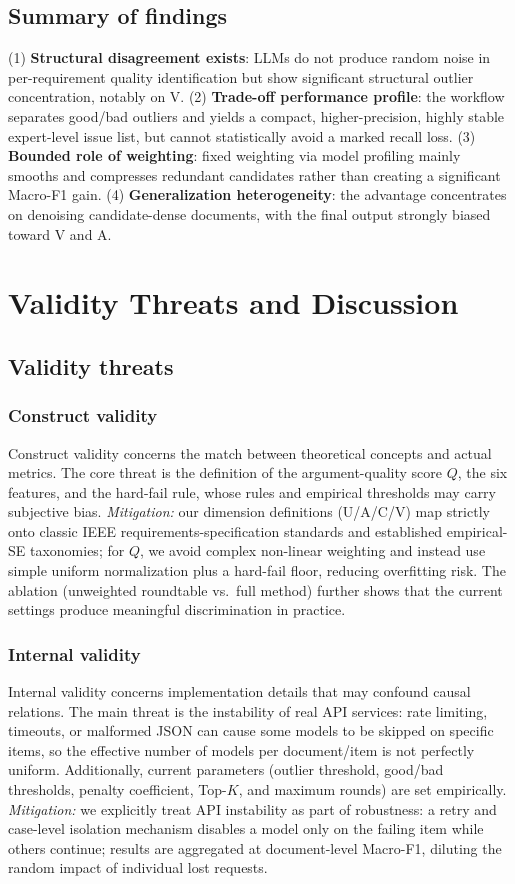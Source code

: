 \documentclass[sn-mathphys-num]{sn-jnl}
\begin{document}
\subsection{Summary of findings}
(1) \textbf{Structural disagreement exists}: LLMs do not produce random noise in per-requirement quality identification but show significant structural outlier concentration, notably on V. (2) \textbf{Trade-off performance profile}: the workflow separates good/bad outliers and yields a compact, higher-precision, highly stable expert-level issue list, but cannot statistically avoid a marked recall loss. (3) \textbf{Bounded role of weighting}: fixed weighting via model profiling mainly smooths and compresses redundant candidates rather than creating a significant Macro-F1 gain. (4) \textbf{Generalization heterogeneity}: the advantage concentrates on denoising candidate-dense documents, with the final output strongly biased toward V and A.

\section{Validity Threats and Discussion}\label{sec:validity}
\subsection{Validity threats}
\subsubsection{Construct validity}
Construct validity concerns the match between theoretical concepts and actual metrics. The core threat is the definition of the argument-quality score $Q$, the six features, and the hard-fail rule, whose rules and empirical thresholds may carry subjective bias. \textit{Mitigation:} our dimension definitions (U/A/C/V) map strictly onto classic IEEE requirements-specification standards and established empirical-SE taxonomies; for $Q$, we avoid complex non-linear weighting and instead use simple uniform normalization plus a hard-fail floor, reducing overfitting risk. The ablation (unweighted roundtable vs.\ full method) further shows that the current settings produce meaningful discrimination in practice.

\subsubsection{Internal validity}
Internal validity concerns implementation details that may confound causal relations. The main threat is the instability of real API services: rate limiting, timeouts, or malformed JSON can cause some models to be skipped on specific items, so the effective number of models per document/item is not perfectly uniform. Additionally, current parameters (outlier threshold, good/bad thresholds, penalty coefficient, Top-$K$, and maximum rounds) are set empirically. \textit{Mitigation:} we explicitly treat API instability as part of robustness: a retry and case-level isolation mechanism disables a model only on the failing item while others continue; results are aggregated at document-level Macro-F1, diluting the random impact of individual lost requests.
\end{document}
